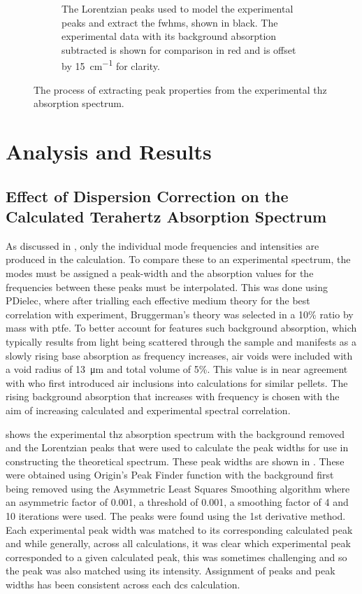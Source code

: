 \begin{figure}
\begin{subfigure}{1\textwidth}
    \caption{The Lorentzian peaks used to model the experimental peaks and extract the \acrshort{fwhm}s, shown in black. The experimental data with its background absorption subtracted is shown for comparison in red and is offset by \SI{15}{cm^{-1}} for clarity.}
    \label{fig:aLM_abs_lorentz}
\end{subfigure}
\captionsetup{font = footnotesize, justification = centering}
\caption[Extraction of Experimental Peak Widths]{The process of extracting peak properties from the experimental \acrshort{thz} absorption spectrum.}
\label{fig:peak_widths}
\end{figure}

\section{Analysis and Results}
\subsection{Effect of Dispersion Correction on the Calculated Terahertz Absorption Spectrum}
\label{subsec:ch4_spectra}
As discussed in , only the individual mode frequencies and intensities are produced in the calculation. To compare these to an experimental spectrum, the modes must be assigned a peak\nobreakdash-width and the absorption values for the frequencies between these peaks must be interpolated. This was done using PDielec, where after trialling each effective medium theory for the best correlation with experiment, Bruggerman's \cite{Bruggeman1935} theory was selected in a 10\% ratio by mass with \acrshort{ptfe}. To better account for features such background absorption, which typically results from light being scattered through the sample and manifests as a slowly rising base absorption as frequency increases, air voids were included with a void radius of \SI{13}{\micro\metre} and total volume of 5\%. This value is in near agreement with \cite{Parrott2009} who first introduced air inclusions into calculations for similar pellets. The rising background absorption that increases with frequency is chosen with the aim of increasing calculated and experimental spectral correlation.

 shows the experimental \acrshort{thz} absorption spectrum with the background removed and the Lorentzian peaks that were used to calculate the peak widths for use in constructing the theoretical spectrum. These peak widths are shown in . These were obtained using Origin's Peak Finder function with the background first being removed using the Asymmetric Least Squares Smoothing algorithm where an asymmetric factor of 0.001, a threshold of 0.001, a smoothing factor of 4 and 10 iterations were used. The peaks were found using the 1st derivative method. Each experimental peak width was matched to its corresponding calculated peak and while generally, across all calculations, it was clear which experimental peak corresponded to a given calculated peak, this was sometimes challenging and so the peak was also matched using its intensity. Assignment of peaks and peak widths has been consistent across each \acrshort{dc}s calculation. 

